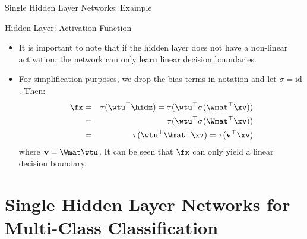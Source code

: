 \begin{frame} {Single Hidden Layer Networks: Example}
\begin{figure}
  \end{figure}
\end{frame}

\begin{frame} {Hidden Layer: Activation Function}
\begin{itemize}
\item It is important to note that if the hidden layer does not have a non-linear activation, the network can only learn linear decision boundaries.
\item For simplification purposes, we drop the bias terms in notation and let $\sigma = \text{id}$. Then:
    \begin{eqnarray*}
        \fx & = & \tau(\wtu^\top \hidz) = \tau(\wtu^\top \sigma(\Wmat^\top \xv)) \\
         & = & \tau(\wtu^\top \sigma(\Wmat^\top \xv)) \\
         & = & \tau(\wtu^\top\Wmat^\top \xv) = \tau(\mathbf{v}^\top \xv)
      \end{eqnarray*}
      where $ \mathbf{v} = \Wmat\wtu$. It can be seen that $\fx$ can only yield a linear decision boundary.
  \end{itemize}
\end{frame}

\section{Single Hidden Layer Networks for Multi-Class Classification}

